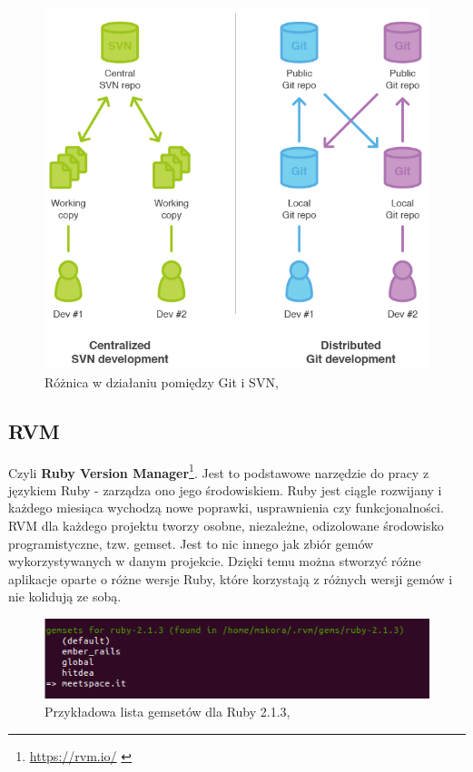   \begin{figure}
    \centering
    \includegraphics[scale=0.45]{images/gitsvn.png}
    \caption{Różnica w działaniu pomiędzy Git i SVN, \cite{git}}
  \end{figure}

  \subsection{RVM}
   \label{sec:RVM}
  Czyli \textbf{Ruby Version Manager}\footnote{\url{https://rvm.io/} \cite{programming_ruby}}. Jest to podstawowe narzędzie do pracy z językiem Ruby - zarządza ono jego środowiskiem. Ruby jest ciągle rozwijany i każdego miesiąca wychodzą nowe poprawki, usprawnienia czy funkcjonalności. RVM dla każdego projektu tworzy osobne, niezależne, odizolowane środowisko programistyczne, tzw. gemset. Jest to nic innego jak zbiór gemów wykorzystywanych w danym projekcie. Dzięki temu można stworzyć różne aplikacje oparte o różne wersje Ruby, które korzystają z różnych wersji gemów i nie kolidują ze sobą.
  \begin{figure}[h]
  \centering
  \includegraphics[scale=0.84]{images/rvm.png}
  \caption{Przykładowa lista gemsetów dla Ruby 2.1.3,\cite{rubydoc}}
  \end{figure}

